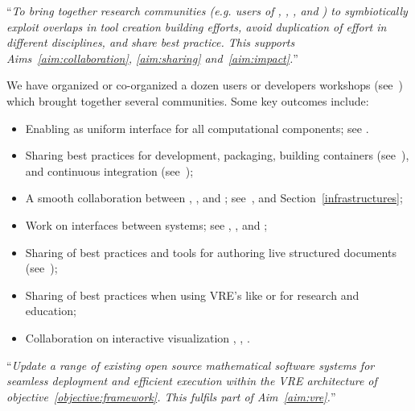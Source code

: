 \begin{compactenum}[\bf O1\rm:]
\item \label{objective:community} ``\emph{To bring together research
  communities (e.g. users of \Jupyter, \Sage, \Singular, and \GAP) to
  symbiotically exploit overlaps in tool creation building efforts,
  avoid duplication of effort in different disciplines, and share best
  practice. This supports Aims~\ref{aim:collaboration},
  \ref{aim:sharing} and~\ref{aim:impact}.}''

  We have organized or co-organized a dozen users or developers
  workshops (see~) which brought
  together several communities. Some key outcomes include:
  \begin{itemize}
  \item Enabling \Jupyter as uniform interface for all computational
    components; see .
  \item Sharing best practices for development, packaging, building
    containers
    (see~),
    and continuous integration
    (see~);
  \item A smooth collaboration between \JupyterHub, \SMC, and \Simulagora;
    see~,
     and
    Section~\ref{infrastructures};
  \item Work on interfaces between systems; see
    , ,
    and ;
  \item Sharing of best practices and tools for authoring live structured
    documents (see~);
  \item Sharing of best practices when using VRE's like \cocalc or \Jupyter for research and
    education;
  \item Collaboration on interactive visualization
    , ,
    .
  \end{itemize}

\item \label{objective:updates} ``\emph{Update a range of existing open source
  mathematical software systems for seamless deployment and efficient
  execution within the VRE architecture of objective~\ref{objective:framework}.
  This fulfils part of Aim~\ref{aim:vre}.}''


\end{compactenum}
